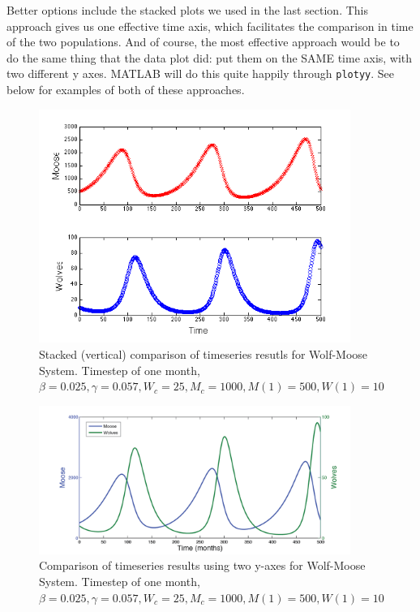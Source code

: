 \documentclass{tufte-handout}
\begin{document}
Better options include the stacked plots we used in the last section.  This approach gives us one effective time axis, which facilitates the comparison in time of the two populations.  And of course, the most effective approach would be to do the same thing that the data plot did:  put them on the SAME time axis, with two different y axes.  MATLAB will do this quite happily through {\tt plotyy}. See below for examples of both of these approaches.

\begin{figure}
\includegraphics[width=4in]{figs/StackedWolfMooseTImeSeries}
\caption{Stacked (vertical) comparison of timeseries resutls for Wolf-Moose System. Timestep of one month,   $\beta = 0.025, \gamma = 0.057, W_c = 25, M_c=1000, M(1) = 500, W(1) = 10$}
\end{figure}



\begin{figure}
\includegraphics[width=4in]{figs/CombinedWolfMooseTImeSeries}
\caption{Comparison of timeseries results using two y-axes for Wolf-Moose System. Timestep of one month,   $\beta = 0.025, \gamma = 0.057, W_c = 25, M_c=1000, M(1) = 500, W(1) = 10$}
\end{figure}
\end{document}
